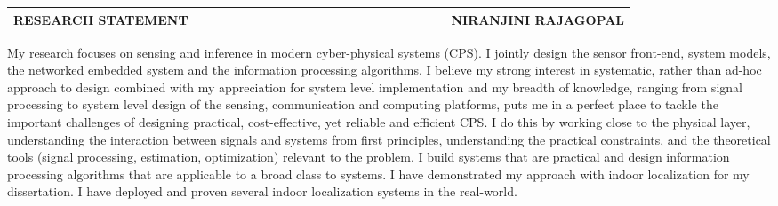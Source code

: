 \documentclass[10pt]{article}
\date{}
\begin{document}

\begin{table}
\color{blue}
\begin{tabular*}{\textwidth}{l r}
\large\textbf{RESEARCH STATEMENT} & 
\hfill \ \ \ \ \ \ \ \ \ \ \ \ \ \ \ \ \ \ \ \
\ \ \ \ \ \ \ \ \ \ \ \ \ \ \ 
\large\textbf{NIRANJINI RAJAGOPAL}\\
\hline
\end{tabular*}

\end{table}

My research focuses on sensing and inference in modern cyber-physical systems (CPS). I jointly design the sensor front-end, system models, the networked embedded system and the information processing algorithms. I believe my strong interest in systematic, rather than ad-hoc approach to design combined with my appreciation for system level implementation and my breadth of knowledge, ranging from signal processing to system level design of the sensing, communication and computing platforms, puts me in a perfect place to tackle the important challenges of designing practical, cost-effective, yet reliable and efficient CPS. I do this by working close to the physical layer, understanding the interaction between signals and systems from first principles, understanding the practical constraints, and the theoretical tools (signal processing, estimation, optimization) relevant to the problem. I build systems that are practical and design information processing algorithms that are applicable to a broad class to systems. I have demonstrated my approach with indoor localization for my dissertation. I have deployed and proven several indoor localization systems in the real-world.\\

\end{document}
